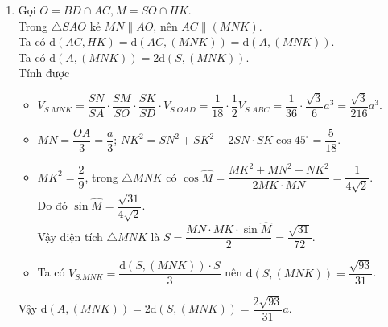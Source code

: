 \begin{bt}
{\begin{enumerate}
		\item Gọi $O=B D \cap A C, M=S O \cap H K$.\\
		Trong $\triangle SAO$ kẻ $MN \parallel AO$, nên $AC\parallel (MNK)$.\\
		Ta có $\mathrm{d}(AC,HK)=\mathrm{d}(AC,(MNK))=\mathrm{d}(A,(MNK))$.\\
		Ta có $\mathrm{d}(A,(MNK))=2\mathrm{d}(S,(MNK))$.\\
		Tính được 
		\begin{itemize}
			\item $V_{S.MNK}=\dfrac{SN}{SA}\cdot \dfrac{SM}{SO}\cdot \dfrac{SK}{SD}\cdot V_{S.OAD}=\dfrac{1}{18}\cdot \dfrac{1}{2}V_{S.ABC}=\dfrac{1}{36}\cdot \dfrac{\sqrt{3}}{6} a^3=\dfrac{\sqrt{3}}{216}a^3$.
			\item $MN=\dfrac{OA}{3}=\dfrac{a}{3}$; $NK^2=SN^2+SK^2-2SN\cdot SK\cos 45^\circ=\dfrac{5}{18}$.
			\item $MK^2=\dfrac{2}{9}$, trong $\triangle MNK$ có $\cos \widehat{M}=\dfrac{MK^2+MN^2-NK^2}{2MK\cdot MN}=\dfrac{1}{4\sqrt{2}}$.\\ Do đó $\sin \widehat{M}=\dfrac{\sqrt{31}}{4\sqrt{2}}$. \\Vậy diện tích $\triangle MNK$ là $S=\dfrac{MN\cdot MK\cdot \sin \widehat{M}}{2}=\dfrac{\sqrt{31}}{72}$.
			\item Ta có $V_{S.MNK}=\dfrac{\mathrm{d}(S,(MNK))\cdot S}{3}$ nên $\mathrm{d}(S,(MNK))=\dfrac{\sqrt{93}}{31}$.
		\end{itemize}
		Vậy $\mathrm{d}(A,(MNK))=2\mathrm{d}(S,(MNK))=\dfrac{2 \sqrt{93}}{31}a$.
		\end{enumerate}
	}
\end{bt}

